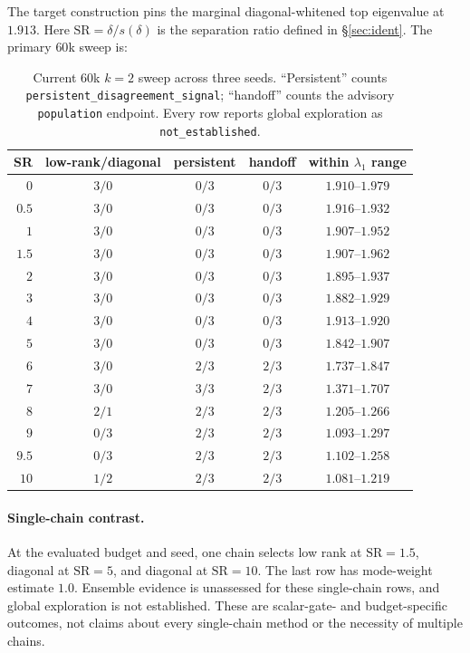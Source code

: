 \documentclass[11pt]{article}
\theoremstyle{plain}
\theoremstyle{definition}
\theoremstyle{remark}
\begin{document}
The target construction pins the marginal diagonal-whitened top eigenvalue at
$1.913$. Here $\mathrm{SR}=\delta/s(\delta)$ is the separation ratio defined in
\S\ref{sec:ident}. The primary $60$k sweep is:
\begin{table}[H]\centering
\caption{Current $60$k $k=2$ sweep across three seeds. ``Persistent'' counts
\nolinkurl{persistent_disagreement_signal}; ``handoff'' counts the advisory
\texttt{population} endpoint. Every row reports global exploration as
\nolinkurl{not_established}.}
\label{tab:gmm-regimes}
\small
\setlength{\tabcolsep}{5pt}
\begin{tabular}{@{}rcccc@{}}
\toprule
SR & low-rank/diagonal & persistent & handoff & within $\lambda_1$ range \\
\midrule
$0$   & $3/0$ & $0/3$ & $0/3$ & $1.910$--$1.979$ \\
$0.5$ & $3/0$ & $0/3$ & $0/3$ & $1.916$--$1.932$ \\
$1$   & $3/0$ & $0/3$ & $0/3$ & $1.907$--$1.952$ \\
$1.5$ & $3/0$ & $0/3$ & $0/3$ & $1.907$--$1.962$ \\
$2$   & $3/0$ & $0/3$ & $0/3$ & $1.895$--$1.937$ \\
$3$   & $3/0$ & $0/3$ & $0/3$ & $1.882$--$1.929$ \\
$4$   & $3/0$ & $0/3$ & $0/3$ & $1.913$--$1.920$ \\
$5$   & $3/0$ & $0/3$ & $0/3$ & $1.842$--$1.907$ \\
$6$   & $3/0$ & $2/3$ & $2/3$ & $1.737$--$1.847$ \\
$7$   & $3/0$ & $3/3$ & $2/3$ & $1.371$--$1.707$ \\
$8$   & $2/1$ & $2/3$ & $2/3$ & $1.205$--$1.266$ \\
$9$   & $0/3$ & $2/3$ & $2/3$ & $1.093$--$1.297$ \\
$9.5$ & $0/3$ & $2/3$ & $2/3$ & $1.102$--$1.258$ \\
$10$  & $1/2$ & $2/3$ & $2/3$ & $1.081$--$1.219$ \\
\bottomrule
\end{tabular}
\end{table}

\paragraph{Single-chain contrast.}
At the evaluated budget and seed, one chain selects low rank at
$\mathrm{SR}=1.5$, diagonal at $\mathrm{SR}=5$, and diagonal at
$\mathrm{SR}=10$. The last row has mode-weight estimate $1.0$. Ensemble
evidence is unassessed for these single-chain rows, and global exploration is
not established. These are scalar-gate- and budget-specific outcomes, not
claims about every single-chain method or the necessity of multiple chains.
\end{document}
